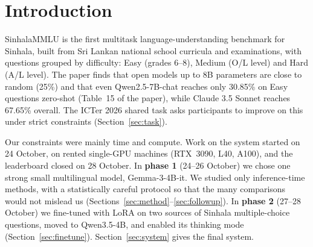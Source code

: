 \documentclass[10pt,a4paper]{article}
\begin{document}
\tableofcontents
\newpage

\section{Introduction}
SinhalaMMLU \cite{pramodya2025} is the first multitask language-understanding benchmark for Sinhala, built from Sri
Lankan national school curricula and examinations, with questions grouped by difficulty: Easy (grades 6--8),
Medium (O/L level) and Hard (A/L level). The paper finds that open models up to 8B parameters are close to random
(25\%) and that even Qwen2.5-7B-chat reaches only 30.85\% on Easy questions zero-shot (Table~15 of the paper), while
Claude 3.5 Sonnet reaches 67.65\% overall. The ICTer 2026 shared task asks participants to improve on this under
strict constraints (Section~\ref{sec:task}).

Our constraints were mainly time and compute. Work on the system started on 24 October, on rented single-GPU
machines (RTX~3090, L40, A100), and the leaderboard closed on 28 October. In \textbf{phase 1} (24--26 October) we
chose one strong small multilingual model, Gemma-3-4B-it. We studied only inference-time methods, with a
statistically careful protocol so that the many comparisons would not mislead us (Sections~\ref{sec:method}--\ref{sec:followup}).
In \textbf{phase 2} (27--28 October) we fine-tuned with LoRA on two sources of Sinhala multiple-choice questions, moved
to Qwen3.5-4B, and enabled its thinking mode (Section~\ref{sec:finetune}). Section~\ref{sec:system} gives the final
system.
\end{document}
